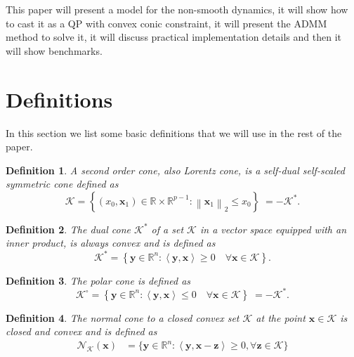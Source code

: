 \documentclass[final,3p]{elsarticle}
\newcommand{\vect}[1]{\bm{#1}}
\newcommand{\norm}[1]{\left\lVert#1\right\rVert}
\newtheorem{definition}{Definition}
\begin{document}
This paper will present a model for the non-smooth dynamics, it will show how to cast it as a QP with convex conic constraint, it will present the ADMM method to solve it, it will discuss practical implementation details and then it will show benchmarks.




\section{Definitions}

In this section we list some basic definitions that we will use in the rest of the paper. 

\begin{definition}
A \textit{second order cone}, also Lorentz cone, is a self-dual self-scaled symmetric cone defined as
\begin{equation}
\label{eq:lorentzcone}
\mathcal{K} 
= \left \{ (x_0,\vect{x}_1) \in \mathbb{R} \times \mathbb{R}^{p-1}: \norm{\vect{x}_1}_2 \leq x_0  \right \} 
\; =   -\mathcal{K}^*.
\end{equation}
\end{definition}

\begin{definition}
The \textit{dual cone} $\mathcal{K}^*$ of a set $\mathcal{K}$ in a vector space equipped with an inner product, is always convex and is defined as
\begin{equation}
\label{eq:dualcone}
\mathcal{K}^* 
= \left \{ \vect{y} \in \mathbb{R}^n: \left\langle \vect{y}, \vect{x} \right\rangle \geq 0 \quad \forall \vect{x} \in \mathcal{K}  \right \}.
\end{equation}
\end{definition}

\begin{definition}
The \textit{polar cone} is defined as
\begin{equation}
\label{eq:polarcone}
\mathcal{K}^\circ 
= \left \{ \vect{y} \in \mathbb{R}^n: \left\langle \vect{y}, \vect{x} \right\rangle \leq 0 \quad \forall \vect{x} \in \mathcal{K}  \right \} 
\; =   -\mathcal{K}^*.
\end{equation}
\end{definition}

\begin{definition}
The \textit{normal cone} to a closed convex set $\mathcal{K}$ at the point $\vect{x}\in\mathcal{K}$ is
closed and convex and is defined as
\begin{align}
\label{eq:normalcone}
\mathcal{N}_{\mathcal{K}}(\vect{x}) 
&= \{ \vect{y} \in \mathbb{R}^n : \left\langle \vect{y}, \vect{x} - \vect{z} \right\rangle \geq 0, \forall \vect{z} \in \mathcal{K} \} 
\end{align}
\end{definition}
\end{document}
